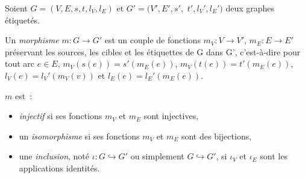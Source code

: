 \begin{definition}[Morphisme]
	\label{def:morphismes-graphes}
	Soient $G = (V,E,s,t,l_{V}, l_{E})$
	et $G' = (V',E',s',$ $t',l_{V}', l_{E}')$ deux graphes étiquetés.

	Un \emph{morphisme} $m: G \to G'$ est un couple de fonctions
	$m_{V} : V \to V'$, $m_{E} : E \to E'$ préservant les sources, les cibles et
	les étiquettes de G dans G', c'est-à-dire pour tout arc $e \in E$,
	$m_{V}(s(e)) = s'(m_{E}(e))$, $m_{V}(t(e)) = t'(m_{E}(e))$, $l_{V}(e) = l_{V}'(m_{V}(v))$ et
	$l_{E}(e) = l_{E}'(m_{E}(e))$.

	\noindent $m$ est~:
	\begin{itemize}
		\item \emph{injectif} si ses fonctions $m_{V}$ et $m_{E}$ sont
		      injectives\footnotemark,
		\item un \emph{isomorphisme} si ses fonctions $m_{V}$ et $m_{E}$ sont des
		      bijections\footnotemark,
		\item une \emph{inclusion}, noté $\iota : G \hookrightarrow G'$ ou simplement $G \hookrightarrow G'$, si
		      $\iota_{V}$ et $\iota_{E}$ sont les applications identités.
	\end{itemize}
\end{definition}

\addtocounter{footnote}{-1}%
%
%




